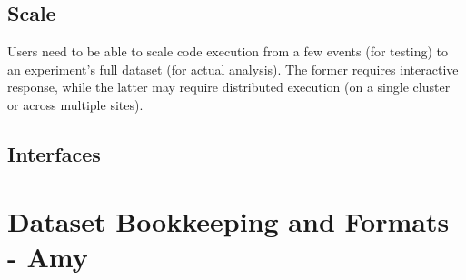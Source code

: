 \subsection{Scale}
Users need to be able to scale code execution from a few events (for testing) to an experiment's full dataset (for actual analysis). The former requires interactive response, while the latter may require distributed execution (on a single cluster or across multiple sites).

\subsection{Interfaces}

\section{Dataset Bookkeeping and Formats - Amy}

